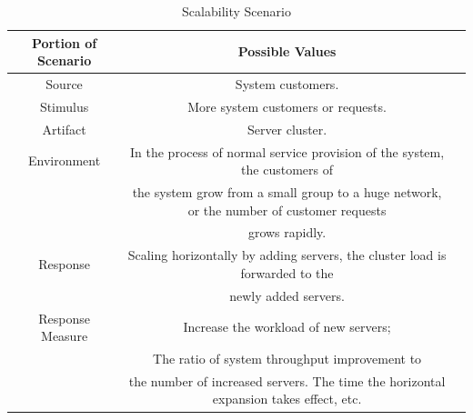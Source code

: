 \documentclass{article}
\begin{document}
	\begin{center}
		\begin{table}[!htb]
		\begin{tabular}{ccc}
		\toprule  
		Portion of Scenario & Possible Values\\
		\midrule 
		Source & System customers.\\
		Stimulus & More system customers or requests.\\
		Artifact & Server cluster.\\
		Environment & In the process of normal service provision of the system, the customers of \\
		& the system grow from a small group to a huge network, or the number of customer requests \\
		& grows rapidly.\\
		Response & Scaling horizontally by adding servers, the cluster load is forwarded to the \\
		& newly added servers.\\
		Response Measure & Increase the workload of new servers; \\
		& The ratio of system throughput improvement to \\
		& the number of increased servers. The time the horizontal expansion takes effect, etc.\\
		\bottomrule
		\end{tabular}
		\caption{Scalability Scenario}
		\end{table}
	\end{center}
\end{document}

